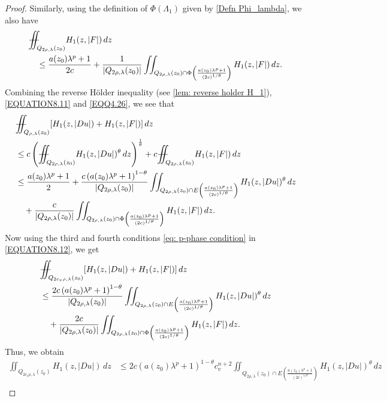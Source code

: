 \documentclass[11pt,oneside, english,reqno,twoside a4paper]{amsart}
\theoremstyle{definition}
\numberwithin{theorem}{section}
\numberwithin{equation}{section}
\newcommand{\iintss}{{\int\hspace{-0.28cm}\int}}
\newcommand{ \miints }{{\iintss\hspace{-0.56cm} -\hspace{-0.15cm}-}}
\newcommand{\miint}[1]{{\miints_{\hspace{-0.13cm}#1}}}
\begin{document}
\begin{proof}
Similarly, using the definition of $\Phi(\Lambda_1)$ given by \eqref{Defn Phi_lambda}, we also have
\begin{align}\label{EQQ4.26}
&\miint{Q_{2\rho, \lambda}(z_0)}H_1(z, |F|)\,dz\nonumber \\
&\quad \leq \frac{a(z_0)\lambda^p+1}{2c} + \frac{1}{\left|Q_{2\rho, \lambda}(z_0)\right|}\iint_{Q_{2\rho, \lambda}(z_0) \cap \Phi\left({\frac{a(z_0)\lambda^p+1}{(2c)^{1/\theta}}}\right)} H_1(z, |F|)\, dz.
\end{align}
Combining the reverse H\"{o}lder inequality (see \cref{lem: reverse holder H_1}), \eqref{EQUATION8.11} and \eqref{EQQ4.26}, we see that
\begin{align}\label{EQUATION8.12}
    &\miint{Q_{\rho, \lambda}(z_0)} [H_1(z, |D u|)+H_1(z, |F|)]\, dz\nonumber \\
    &\leq c\left(\miint{Q_{2\rho, \lambda}(z_0)}H_1(z, |D u|)^{\theta}\,dz\right)^{\frac{1}{\theta}}+c\miint{Q_{2\rho, \lambda}(z_0)}H_1(z, |F|)\, dz\nonumber\\
    &\leq \frac{a(z_0)\lambda^p+1}{2} + \frac{c \left(a(z_0)\lambda^p+1\right)^{1-\theta}}{\left|Q_{2\rho, \lambda}(z_0)\right|}\iint_{Q_{2\rho, \lambda}(z_0) \cap E\left({\frac{a(z_0)\lambda^p+1}{(2c)^{1/\theta}}}\right)} H_1(z, |D u|)^\theta\, dz\nonumber \\
    &\quad +\frac{c}{\left|Q_{2\rho, \lambda}(z_0)\right|}\iint_{Q_{2\rho, \lambda}(z_0) \cap \Phi\left({\frac{a(z_0)\lambda^p+1}{(2c)^{1/\theta}}}\right)} H_1(z, |F|)\, dz.
\end{align}
Now using the third and fourth conditions \eqref{eq: p-phase condition} in \eqref{EQUATION8.12}, we get
\begin{align*}
&\miint{Q_{2c_v\rho, \lambda}(z_0)} [H_1(z, |D u|)+H_1(z, |F|)]\, dz\\
&\leq \frac{2c \left(a(z_0)\lambda^p+1\right)^{1-\theta}}{\left|Q_{2\rho, \lambda}(z_0)\right|}\iint_{Q_{2\rho, \lambda}(z_0) \cap E\left({\frac{a(z_0)\lambda^p+1}{(2c)^{1/\theta}}}\right)} H_1(z, |D u|)^\theta\, dz\\
&\quad +\frac{2c}{\left|Q_{2\rho, \lambda}(z_0)\right|}\iint_{Q_{2\rho, \lambda}(z_0) \cap \Phi\left({\frac{a(z_0)\lambda^p+1}{(2c)^{1/\theta}}}\right)} H_1(z, |F|)\, dz.
\end{align*}
Thus, we obtain
\begin{align}\label{EQQ6.33}
    \iint_{Q_{2c_v \rho, \lambda}(z_0)}H_1(z, |Du|)\,dz &\leq 2c \left(a(z_0)\lambda^p+1\right)^{1-\theta}c^{n+2}_v\iint_{Q_{2\rho, \lambda}(z_0) \cap E\left({\frac{a(z_0)\lambda^p+1}{(2c)^{1/\theta}}}\right)} H_1(z, |D u|)^\theta\, dz\nonumber\\

\end{align}
\end{proof}
\end{document}
